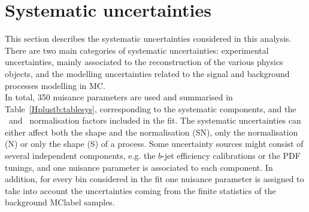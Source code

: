 \section{Systematic uncertainties}
This section describes the systematic uncertainties considered in this analysis. There are two main categories of systematic uncertainties: experimental uncertainties, mainly associated to the reconstruction of the various physics objects, and the modelling uncertainties related to the signal and background processes modelling in MC.\\

In total, 350 nuisance parameters are used and summarised in Table~\ref{Hplustb:tablesys}, corresponding to the systematic components, and the \ttb\ and \ttc\ normalisation factors included in the fit. The systematic uncertainties can either affect both the shape and the normalisation (SN), only the normalisation (N) or only the shape (S) of a process. Some uncertainty sources might consist of several independent components, e.g. the $b$-jet efficiency calibrations or the PDF tunings, and one nuisance parameter is associated to each component. In addition, for every bin considered in the fit one nuisance parameter is assigned to take into account the uncertainties coming from the finite statistics of the background \acrshort{MClabel} samples.

